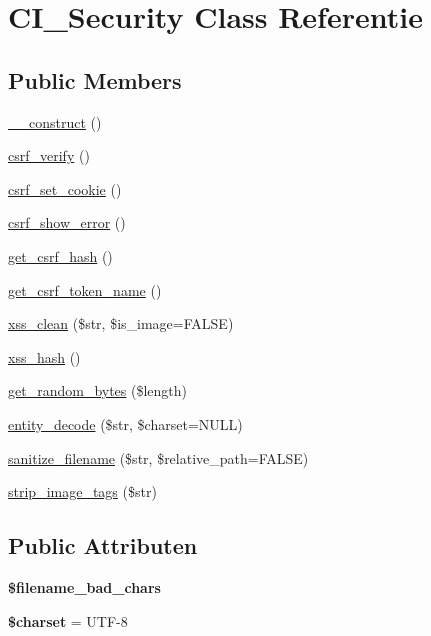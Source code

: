 \hypertarget{class_c_i___security}{}\section{C\+I\+\_\+\+Security Class Referentie}
\label{class_c_i___security}
\subsection*{Public Members}
\begin{DoxyCompactItemize}
\item 
\mbox{\hyperlink{class_c_i___security_a095c5d389db211932136b53f25f39685}{\+\_\+\+\_\+construct}} ()
\item 
\mbox{\hyperlink{class_c_i___security_a03c037268db0c2e6221b65a736eaee07}{csrf\+\_\+verify}} ()
\item 
\mbox{\hyperlink{class_c_i___security_a55b1380b93b71ab3d9873bb967c2b9bb}{csrf\+\_\+set\+\_\+cookie}} ()
\item 
\mbox{\hyperlink{class_c_i___security_a3d09c1dc706abfaad987661805c28a06}{csrf\+\_\+show\+\_\+error}} ()
\item 
\mbox{\hyperlink{class_c_i___security_a1644fd8967db3a1b94988d730ca34991}{get\+\_\+csrf\+\_\+hash}} ()
\item 
\mbox{\hyperlink{class_c_i___security_a00640f51b90b7d946e9d3a4f0c9f628e}{get\+\_\+csrf\+\_\+token\+\_\+name}} ()
\item 
\mbox{\hyperlink{class_c_i___security_acb759426dbab128d3d8164805225381c}{xss\+\_\+clean}} (\$str, \$is\+\_\+image=F\+A\+L\+SE)
\item 
\mbox{\hyperlink{class_c_i___security_ae2f831d3f277e1c03730b28fd1734186}{xss\+\_\+hash}} ()
\item 
\mbox{\hyperlink{class_c_i___security_a7d1d64e6798b98cb46fcdb304a4e1de2}{get\+\_\+random\+\_\+bytes}} (\$length)
\item 
\mbox{\hyperlink{class_c_i___security_a8bec9918f4d35c9e6340e1dc6a32ba14}{entity\+\_\+decode}} (\$str, \$charset=N\+U\+LL)
\item 
\mbox{\hyperlink{class_c_i___security_aaba16489285496bdc03fd12f699a08f6}{sanitize\+\_\+filename}} (\$str, \$relative\+\_\+path=F\+A\+L\+SE)
\item 
\mbox{\hyperlink{class_c_i___security_abb836a42971c7bc641588db779c6ab1d}{strip\+\_\+image\+\_\+tags}} (\$str)
\end{DoxyCompactItemize}
\subsection*{Public Attributen}
\begin{DoxyCompactItemize}
\item 
{\bfseries \$filename\+\_\+bad\+\_\+chars}
\item 
\mbox{\label{class_c_i___security_af10158dd74b75f1d337e83102d6b82ce}} 
{\bfseries \$charset} = \textquotesingle{}U\+TF-\/8\textquotesingle{}
\end{DoxyCompactItemize}
